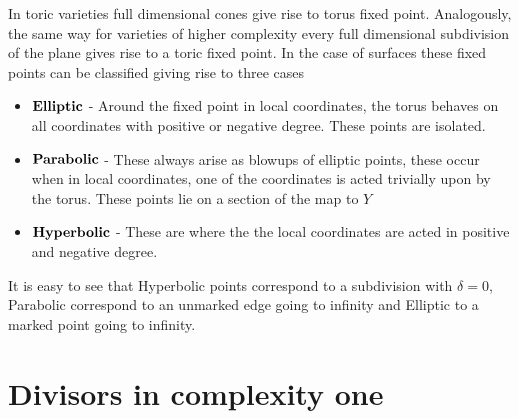 \documentclass[12pt,a4paper]{book}      %
\theoremstyle{definition}
\newtheorem{dfn}[thm]{Definition}
\begin{document}
\begin{comment}
\begin{dfn}
A fansy divisor a smooth curve $C$ is a collection of $n$ subdivison of $\mathbb{Q}$ with markings $\mathbb{Q}^+$, $\mathbb{Q}^-$, $\mathbb{Q}^\pm$ or no markings at all. 
\end{dfn}
This is equivalent to a polyhedral divisor provided the the assumptions of \ref{Tech} are satisfied.


This defines a complexity one surface. 
\end{comment}

In toric varieties full dimensional cones give rise to torus fixed point. Analogously, the same way for varieties of higher complexity every full dimensional subdivision of the plane gives rise to a toric fixed point. In the case of surfaces these fixed points can be classified giving rise to three cases
\begin{itemize}
\item $\bold{Elliptic}$ - Around the fixed point in local coordinates, the torus behaves on all coordinates with positive or negative degree. These points are isolated.
\item $\bold{Parabolic}$ - These always arise as blowups of elliptic points, these occur when in local coordinates, one of the coordinates is acted trivially upon by the torus. These points lie on a section of the map to $Y$
\item $\bold{Hyperbolic}$ - These are where the the local coordinates are acted in positive and negative degree.
\end{itemize}
It is easy to see that Hyperbolic points correspond to a subdivision with $\delta = 0$, Parabolic correspond to an unmarked edge going to infinity and Elliptic to a marked point going to infinity.
\section{Divisors in complexity one}
\end{document}
